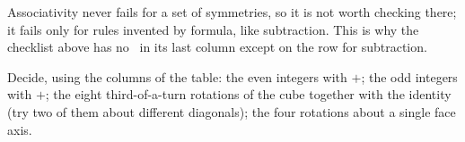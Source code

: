 
\begin{why}
Associativity never fails for a set of symmetries, so it is not worth checking there; it fails only
for rules invented by formula, like subtraction. This is why the checklist above has no
\xmark\ in its last column except on the row for subtraction.
\end{why}

\begin{tryit}
Decide, using the columns of the table: the even integers with $+$; the odd integers with $+$; the
eight third-of-a-turn rotations of the cube together with the identity (try two of them about
different diagonals); the four rotations about a single face axis.
\end{tryit}
